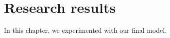 \chapter{Research results}

\label{chap:research-results}


In this chapter, we experimented with our final model. 
